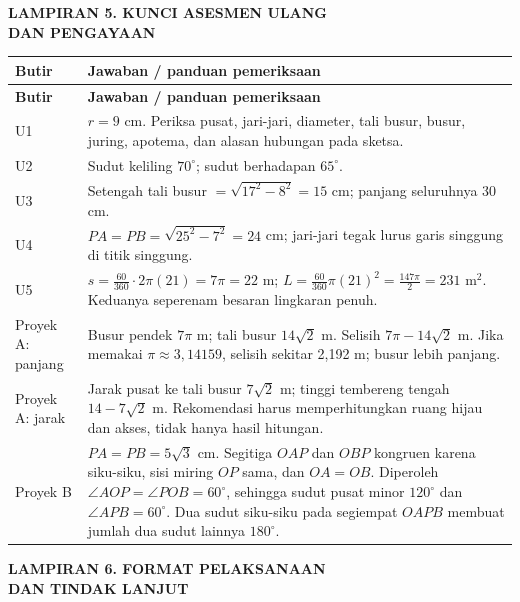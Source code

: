 \documentclass[11pt,a4paper]{article}
\begin{document}
\clearpage
\begin{center}\bfseries\large LAMPIRAN 5. KUNCI ASESMEN ULANG\\[2pt] DAN PENGAYAAN\end{center}\medskip
{\small\setlength{\tabcolsep}{2mm}\renewcommand{\arraystretch}{1.35}\begin{longtable}{|>{\raggedright\arraybackslash}p{31.791mm}|>{\raggedright\arraybackslash}p{137.759mm}|}\hline
\rowcolor{gray!10}\textbf{Butir} & \textbf{Jawaban / panduan pemeriksaan}\\ \hline
\endfirsthead
\rowcolor{gray!10}\textbf{Butir} & \textbf{Jawaban / panduan pemeriksaan}\\ \hline
\endhead
U1 & \(r=9\) cm. Periksa pusat, jari-jari, diameter, tali busur, busur, juring, apotema, dan alasan hubungan pada sketsa.\\ \hline
U2 & Sudut keliling \(70^\circ\); sudut berhadapan \(65^\circ\).\\ \hline
U3 & Setengah tali busur \(=\sqrt{17^2-8^2}=15\) cm; panjang seluruhnya 30 cm.\\ \hline
U4 & \(PA=PB=\sqrt{25^2-7^2}=24\) cm; jari-jari tegak lurus garis singgung di titik singgung.\\ \hline
U5 & \(s=\frac{60}{360}\cdot2\pi(21)=7\pi=22\) m; \(L=\frac{60}{360}\pi(21)^2=\frac{147\pi}{2}=231\) m\(^2\). Keduanya seperenam besaran lingkaran penuh.\\ \hline
Proyek A: panjang & Busur pendek \(7\pi\) m; tali busur \(14\sqrt2\) m. Selisih \(7\pi-14\sqrt2\) m. Jika memakai \(\pi\approx3{,}14159\), selisih sekitar 2,192 m; busur lebih panjang.\\ \hline
Proyek A: jarak & Jarak pusat ke tali busur \(7\sqrt2\) m; tinggi tembereng tengah \(14-7\sqrt2\) m. Rekomendasi harus memperhitungkan ruang hijau dan akses, tidak hanya hasil hitungan.\\ \hline
Proyek B & \(PA=PB=5\sqrt3\) cm. Segitiga \(OAP\) dan \(OBP\) kongruen karena siku-siku, sisi miring \(OP\) sama, dan \(OA=OB\). Diperoleh \(\angle AOP=\angle POB=60^\circ\), sehingga sudut pusat minor \(120^\circ\) dan \(\angle APB=60^\circ\). Dua sudut siku-siku pada segiempat \(OAPB\) membuat jumlah dua sudut lainnya \(180^\circ\).\\ \hline
\end{longtable}}\medskip
\clearpage
\begin{center}\bfseries\large LAMPIRAN 6. FORMAT PELAKSANAAN\\[2pt] DAN TINDAK LANJUT\end{center}\medskip
\end{document}
